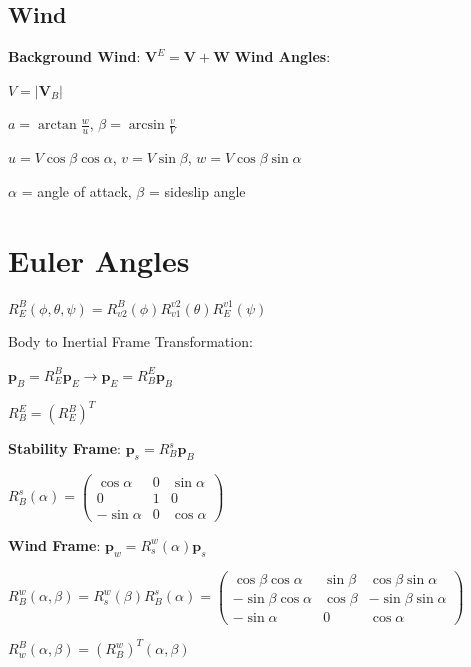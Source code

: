 \documentclass{article}
\begin{document}
\begin{multicols*}{3}
\subsection*{Wind}
\textbf{Background Wind}: $\mathbf{V}^E=\mathbf{V}+\mathbf{W}$
\textbf{Wind Angles}:\par 
$V = |\mathbf{V}_B|$\par
$a=\arctan{\frac{w}{u}}$, $\beta=\arcsin{\frac{v}{V}}$\par 
$u = V\cos{\beta}\cos{\alpha}$, $v=V\sin{\beta}$, $w=V\cos{\beta}\sin{\alpha}$\par 
$\alpha$ = angle of attack, $\beta$ = sideslip angle
\section*{Euler Angles}
$R_E^B(\phi,\theta,\psi)=R_{v2}^B(\phi)R_{v1}^{v2}(\theta)R_E^{v1}(\psi)$\par 
Body to Inertial Frame Transformation:\par 
$\mathbf{p}_B=R_E^B\mathbf{p}_E \rightarrow \mathbf{p}_E=R_B^E\mathbf{p}_B$\par 
$R_B^E=(R_E^B)^{T}$\par 
\textbf{Stability Frame}: $\mathbf{p}_s=R_B^s\mathbf{p}_B$\par 
$R_B^s(\alpha)=
\begin{pmatrix}
    \cos{\alpha} & 0 & \sin{\alpha}\\
    0 & 1 & 0\\
    -\sin{\alpha} & 0 & \cos{\alpha}
\end{pmatrix}$\par
\textbf{Wind Frame}: $\mathbf{p}_w=R_s^w(\alpha)\mathbf{p}_s$\par
$R_B^w(\alpha,\beta)=R_s^w(\beta)R_B^s(\alpha) = 
\begin{pmatrix}
    \cos{\beta}\cos{\alpha} & \sin{\beta} & \cos{\beta}\sin{\alpha}\\
    -\sin{\beta}\cos{\alpha} & \cos{\beta} & -\sin{\beta}\sin{\alpha}\\
    -\sin{\alpha} & 0 & \cos{\alpha}
\end{pmatrix}$\par 
$R_w^B(\alpha,\beta)=(R_B^w)^T(\alpha,\beta)$

\end{multicols*}
\end{document}
